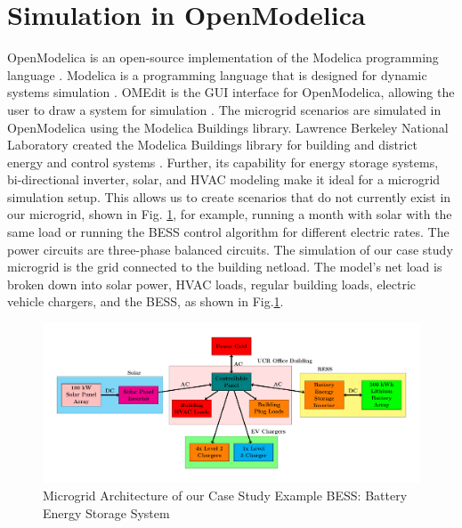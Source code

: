 \documentclass[conference,  usletter]{IEEEtran}
\begin{document}
 \section{Simulation in OpenModelica}
 OpenModelica is an open-source implementation of the Modelica programming language \cite{OpenModelica}. Modelica is a programming language that is designed for dynamic systems simulation \cite{ModelicaLanguage}. OMEdit is the GUI interface for OpenModelica, allowing the user to draw a system for simulation \cite{OMEdit}. The microgrid scenarios are simulated in OpenModelica using the Modelica Buildings library. Lawrence Berkeley National Laboratory created the Modelica Buildings library for building and district energy and control systems \cite{ModelicaBuildingsLibrary}.
 Further, its capability for energy storage systems, bi-directional inverter, solar, and HVAC modeling make it ideal for a microgrid simulation setup. This allows us to create scenarios that do not currently exist in our microgrid, shown in Fig. \ref{fig:powersystemsetupfull}, for example, running a month with solar with the same load or running the BESS control algorithm for different electric rates. The power circuits are three-phase balanced circuits. The simulation of our case study microgrid is the grid connected to the building netload. The model's net load is broken down into solar power, HVAC loads, regular building loads, electric vehicle chargers, and the BESS, as shown in Fig.\ref{fig:powersystemsetupfull}.
 \begin{figure}
 	\centering
 	\includegraphics[width=\linewidth]{Fig/power_system_setup_modelica_large}
 	\caption{\footnotesize Microgrid Architecture of our Case Study Example BESS: Battery Energy Storage System}
 	\label{fig:powersystemsetupfull}
 \end{figure}
\end{document}

